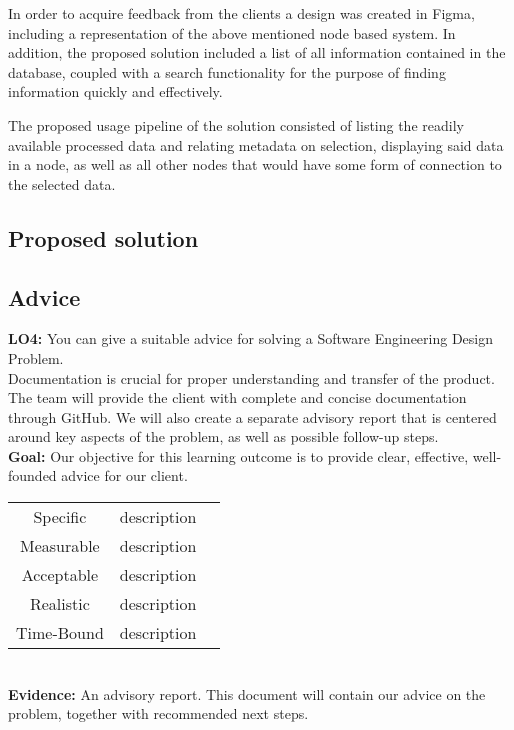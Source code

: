 In order to acquire feedback from the clients a design was created in Figma, including a representation of the above mentioned node based system. In addition, the proposed solution included a list of all information contained in the database, coupled with a search functionality for the purpose of finding information quickly and effectively.

The proposed usage pipeline of the solution consisted of listing the readily available processed data and relating metadata on selection, displaying said data in a node, as well as all other nodes that would have some form of connection to the selected data.


\subsection{Proposed solution}
\label{subsec:Proposed solution}

\subsection{Advice}
\label{subsec:Advice}

\textbf{LO4:} You can give a suitable advice for solving a Software Engineering Design Problem. \\

Documentation is crucial for proper understanding and transfer of the product. The team will provide the client with complete and concise documentation through GitHub. We will also create a separate advisory report that is centered around key aspects of the problem, as well as possible follow-up steps. \\

\textbf{Goal:} Our objective for this learning outcome is to provide clear, effective, well-founded advice for our client.\\

\begin{tabular}{ |c|c|c| } 
	\hline
	Specific & description  \\ 
	Measurable & description  \\ 
	Acceptable & description  \\
	Realistic & description \\
	Time-Bound & description \\ 
	\hline
\end{tabular} \\

\textbf{Evidence:}
An advisory report. This document will contain our advice on the problem, together with recommended next steps. 

